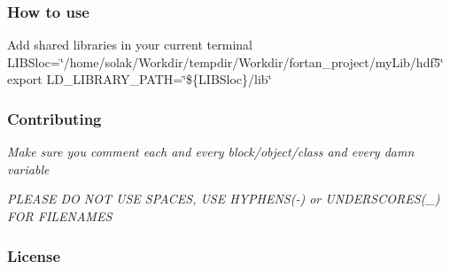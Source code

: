 \subsubsection*{How to use}


\begin{DoxyItemize}
\item Add shared libraries in your current terminal {\ttfamily L\-I\-B\-Sloc=\char`\"{}/home/solak/\-Workdir/tempdir/\-Workdir/fortan\-\_\-project/my\-Lib/hdf5\char`\"{}} {\ttfamily export L\-D\-\_\-\-L\-I\-B\-R\-A\-R\-Y\-\_\-\-P\-A\-T\-H=\char`\"{}\$\{\-L\-I\-B\-Sloc\}/lib\char`\"{}}
\end{DoxyItemize}

\subsubsection*{Contributing}


\begin{DoxyItemize}
\item {\itshape Make sure you comment each and every block/object/class and every damn variable}
\item {\itshape P\-L\-E\-A\-S\-E D\-O N\-O\-T U\-S\-E S\-P\-A\-C\-E\-S, U\-S\-E H\-Y\-P\-H\-E\-N\-S(-\/) or U\-N\-D\-E\-R\-S\-C\-O\-R\-E\-S(\-\_\-) F\-O\-R F\-I\-L\-E\-N\-A\-M\-E\-S}
\end{DoxyItemize}

\subsubsection*{License}